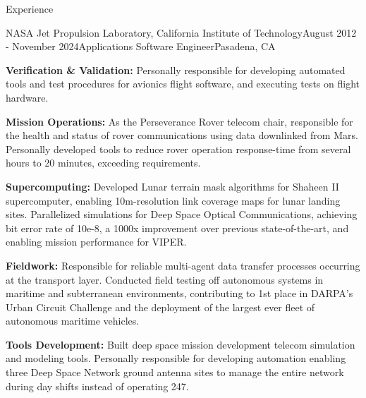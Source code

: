 \documentclass{resume} %
\begin{document}
\begin{rSection}{Experience}
\begin{rSubsection}{NASA Jet Propulsion Laboratory, California Institute of Technology}{August 2012 - November 2024}{Applications Software Engineer}{Pasadena, CA}


\item {\bf{Verification \& Validation:}} 
Personally responsible for developing automated tools and test procedures for avionics flight software, and executing tests on flight hardware. 


\item {\bf{Mission Operations:}}
As the Perseverance Rover telecom chair, responsible for the health and status of rover communications using data downlinked from Mars. Personally developed tools to reduce rover operation response-time from several hours to 20 minutes, exceeding requirements. 


\item {\bf{Supercomputing:}} 
Developed Lunar terrain mask algorithms for Shaheen II supercomputer, enabling 10m-resolution link coverage maps for lunar landing sites. Parallelized simulations for Deep Space Optical Communications, achieving bit error rate of 10e-8, a 1000x improvement over previous state-of-the-art, and enabling mission performance for VIPER. 
 

\item {\bf{Fieldwork:}} 
Responsible for reliable multi-agent data transfer processes occurring at the transport layer. Conducted field testing off autonomous systems in maritime and subterranean environments, contributing to 1st place in DARPA’s Urban Circuit Challenge and the deployment of the largest ever fleet of autonomous maritime vehicles. 


\item {\bf{Tools Development:}}
Built deep space mission development telecom simulation and modeling tools. Personally responsible for developing automation enabling three Deep Space Network ground antenna sites to manage the entire network during day shifts instead of operating 24\/7.


\end{rSubsection}






\end{rSection}
\end{document}
